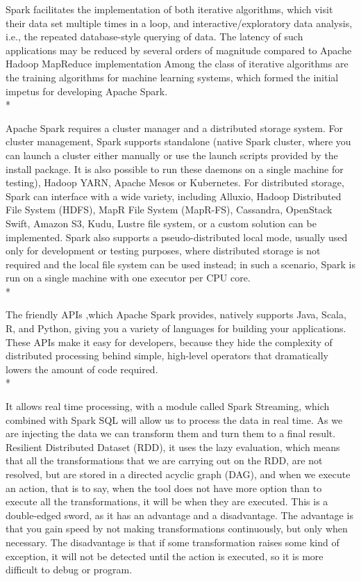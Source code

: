 Spark facilitates the implementation of both iterative algorithms, which visit their data set multiple times in a loop, and interactive/exploratory data analysis, i.e., the repeated database-style querying of data. The latency of such applications may be reduced by several orders of magnitude compared to Apache Hadoop MapReduce implementation Among the class of iterative algorithms are the training algorithms for machine learning systems, which formed the initial impetus for developing Apache Spark. \\*

Apache Spark requires a cluster manager and a distributed storage system. For cluster management, Spark supports standalone (native Spark cluster, where you can launch a cluster either manually or use the launch scripts provided by the install package. It is also possible to run these daemons on a single machine for testing), Hadoop YARN, Apache Mesos or Kubernetes. For distributed storage, Spark can interface with a wide variety, including Alluxio, Hadoop Distributed File System (HDFS), MapR File System (MapR-FS), Cassandra, OpenStack Swift, Amazon S3, Kudu, Lustre file system, or a custom solution can be implemented. Spark also supports a pseudo-distributed local mode, usually used only for development or testing purposes, where distributed storage is not required and the local file system can be used instead; in such a scenario, Spark is run on a single machine with one executor per CPU core.\cite{wang2014characterization} \\*

The friendly APIs ,which Apache Spark provides, natively supports Java, Scala, R, and Python, giving you a variety of languages for building your applications. These APIs make it easy for developers, because they hide the complexity of distributed processing behind simple, high-level operators that dramatically lowers the amount of code required.\\*

It allows real time processing, with a module called Spark Streaming, which combined with Spark SQL will allow us to process the data in real time. As we are injecting the data we can transform them and turn them to a final result.
Resilient Distributed Dataset (RDD), it uses the lazy evaluation, which means that all the transformations that we are carrying out on the RDD, are not resolved, but are stored in a directed acyclic graph (DAG), and when we execute an action, that is to say, when the tool does not have more option than to execute all the transformations, it will be when they are executed. This is a double-edged sword, as it has an advantage and a disadvantage. The advantage is that you gain speed by not making transformations continuously, but only when necessary. The disadvantage is that if some transformation raises some kind of exception, it will not be detected until the action is executed, so it is more difficult to debug or program.

